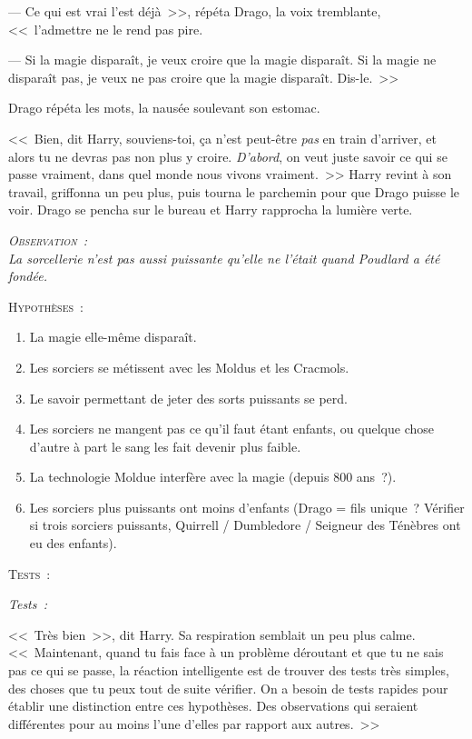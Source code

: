 --- Ce qui est vrai l'est déjà~>>, répéta Drago, la voix tremblante, <<~l'admettre ne le rend pas pire.

--- Si la magie disparaît, je veux croire que la magie disparaît. Si la magie ne disparaît pas, je veux ne pas croire que la magie disparaît. Dis-le.~>>

Drago répéta les mots, la nausée soulevant son estomac.

<<~Bien, dit Harry, souviens-toi, ça n'est peut-être \emph{pas} en train d'arriver, et alors tu ne devras pas non plus y croire. \emph{D'abord}, on veut juste savoir ce qui se passe vraiment, dans quel monde nous vivons vraiment.~>> Harry revint à son travail, griffonna un peu plus, puis tourna le parchemin pour que Drago puisse le voir. Drago se pencha sur le bureau et Harry rapprocha la lumière verte.

\begin{center}\itshape
{\scshape Observation~:}\\
La sorcellerie n'est pas aussi puissante qu'elle ne l'était quand Poudlard a été fondée. 

{\scshape Hypothèses~:}
\begin{enumerate}[1.]\firmlist
\item La magie elle-même disparaît.
\item Les sorciers se métissent avec les Moldus et les Cracmols.
\item Le savoir permettant de jeter des sorts puissants se perd.
\item Les sorciers ne mangent pas ce qu'il faut étant enfants, ou quelque chose d'autre à part le sang les fait devenir plus faible.
\item La technologie Moldue interfère avec la magie (depuis 800 ans~?).
\item Les sorciers plus puissants ont moins d'enfants (Drago = fils unique~? Vérifier si trois sorciers puissants, Quirrell / Dumbledore / Seigneur des Ténèbres ont eu des enfants). \end{enumerate} {\scshape Tests~:} \end{center}

\emph{{Tests~:}}

<<~Très bien~>>, dit Harry. Sa respiration semblait un peu plus calme. <<~Maintenant, quand tu fais face à un problème déroutant et que tu ne sais pas ce qui se passe, la réaction intelligente est de trouver des tests très simples, des choses que tu peux tout de suite vérifier. On a besoin de tests rapides pour établir une distinction entre ces hypothèses. Des observations qui seraient différentes pour au moins l'une d'elles par rapport aux autres.~>>


